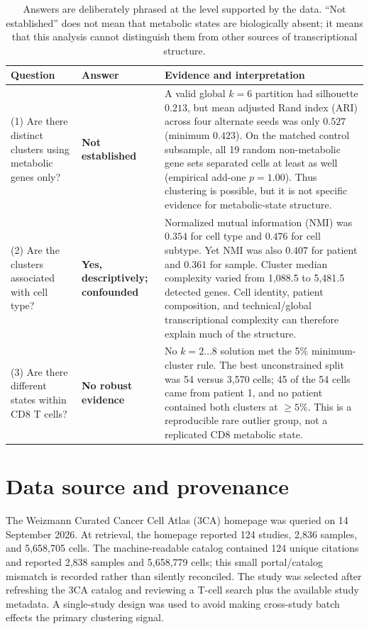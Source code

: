 \documentclass[11pt]{article}
\newcommand{\caution}[1]{\textcolor{orange!65!black}{\textbf{#1}}}
\newcommand{\negative}[1]{\textcolor{red!60!black}{\textbf{#1}}}
\begin{document}
\begin{table}[H]
\centering
\small
\begin{tabular}{>{\raggedright\arraybackslash}p{}>{\raggedright\arraybackslash}p{}>{\raggedright\arraybackslash}p{}}
\toprule
Question & Answer & Evidence and interpretation \\
\midrule
(1) Are there distinct clusters using metabolic genes only? & \negative{Not established} & A valid global $k=6$ partition had silhouette $0.213$, but mean adjusted Rand index (ARI) across four alternate seeds was only $0.527$ (minimum $0.423$). On the matched control subsample, all 19 random non-metabolic gene sets separated cells at least as well (empirical add-one $p=1.00$). Thus clustering is possible, but it is not specific evidence for metabolic-state structure. \\
\addlinespace
(2) Are the clusters associated with cell type? & \caution{Yes, descriptively; confounded} & Normalized mutual information (NMI) was $0.354$ for cell type and $0.476$ for cell subtype. Yet NMI was also $0.407$ for patient and $0.361$ for sample. Cluster median complexity varied from 1,088.5 to 5,481.5 detected genes. Cell identity, patient composition, and technical/global transcriptional complexity can therefore explain much of the structure. \\
\addlinespace
(3) Are there different states within CD8 T cells? & \negative{No robust evidence} & No $k=2\ldots8$ solution met the 5\% minimum-cluster rule. The best unconstrained split was 54 versus 3,570 cells; 45 of the 54 cells came from patient 1, and no patient contained both clusters at $\geq5\%$. This is a reproducible rare outlier group, not a replicated CD8 metabolic state. \\
\bottomrule
\end{tabular}
\caption{Answers are deliberately phrased at the level supported by the data. ``Not established'' does not mean that metabolic states are biologically absent; it means that this analysis cannot distinguish them from other sources of transcriptional structure.}
\end{table}

\section{Data source and provenance}

The Weizmann Curated Cancer Cell Atlas (3CA) homepage was queried on 14 September 2026. At retrieval, the homepage reported 124 studies, 2,836 samples, and 5,658,705 cells. The machine-readable catalog contained 124 unique citations and reported 2,838 samples and 5,658,779 cells; this small portal/catalog mismatch is recorded rather than silently reconciled. The study was selected after refreshing the 3CA catalog and reviewing a T-cell search plus the available study metadata. A single-study design was used to avoid making cross-study batch effects the primary clustering signal.
\end{document}
